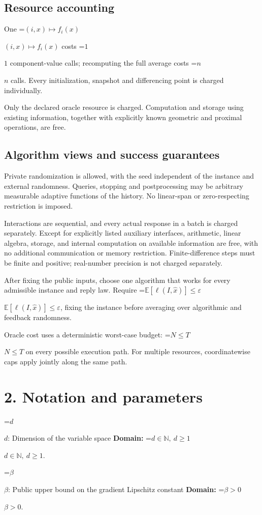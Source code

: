 \documentclass[10pt,a4paper]{article}
\newcommand{\AtlasMath}[1]{\par\begingroup\centering\setbox0=\hbox{$\displaystyle #1$}\ifdim\wd0>1.4\linewidth\typeout{ATLAS WIDE FORMULA: \the\wd0}\fi\ifdim\wd0>\linewidth\resizebox{\linewidth}{!}{\box0}\else\box0\fi\par\endgroup}
\newcommand{\AtlasInlineMath}[1]{\begingroup\setbox0=\hbox{$#1$}\ifdim\wd0>.4\linewidth\endgroup\AtlasMath{#1}\else\endgroup$#1$\fi}
\begin{document}
\subsection{Resource accounting}
One \AtlasInlineMath{(i,x)\mapsto f_i(x)} costs \AtlasInlineMath{1} component-value calls; recomputing the full average costs \AtlasInlineMath{n} calls. Every initialization, snapshot and differencing point is charged individually.

Only the declared oracle resource is charged. Computation and storage using existing information, together with explicitly known geometric and proximal operations, are free.

\subsection{Algorithm views and success guarantees}
Private randomization is allowed, with the seed independent of the instance and external randomness. Queries, stopping and postprocessing may be arbitrary measurable adaptive functions of the history. No linear-span or zero-respecting restriction is imposed.

Interactions are sequential, and every actual response in a batch is charged separately. Except for explicitly listed auxiliary interfaces, arithmetic, linear algebra, storage, and internal computation on available information are free, with no additional communication or memory restriction. Finite-difference steps must be finite and positive; real-number precision is not charged separately.

After fixing the public inputs, choose one algorithm that works for every admissible instance and reply law. Require \AtlasInlineMath{\mathbb{E}[\ell(I,\widehat{x})]\le \varepsilon}, fixing the instance before averaging over algorithmic and feedback randomness.

Oracle cost uses a deterministic worst-case budget: \AtlasInlineMath{N\le T} on every possible execution path. For multiple resources, coordinatewise caps apply jointly along the same path.

\section{2. Notation and parameters}
\AtlasInlineMath{d}: Dimension of the variable space \textbf{Domain:} \AtlasInlineMath{d\in\mathbb{N},\ d\ge1}.

\AtlasInlineMath{\beta}: Public upper bound on the gradient Lipschitz constant \textbf{Domain:} \AtlasInlineMath{\beta>0}.
\end{document}
